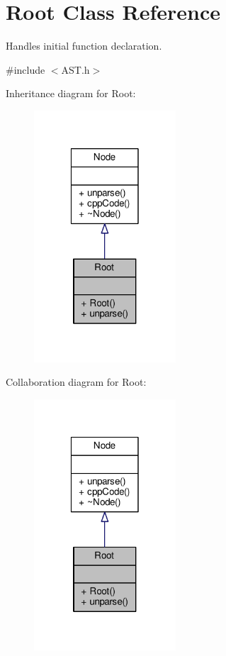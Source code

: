 \hypertarget{classRoot}{\section{Root Class Reference}
\label{classRoot}
}


Handles initial function declaration.  




{\ttfamily \#include $<$A\-S\-T.\-h$>$}



Inheritance diagram for Root\-:\nopagebreak
\begin{figure}[H]
\begin{center}
\leavevmode
\includegraphics[width=150pt]{classRoot__inherit__graph}
\end{center}
\end{figure}


Collaboration diagram for Root\-:\nopagebreak
\begin{figure}[H]
\begin{center}
\leavevmode
\includegraphics[width=150pt]{classRoot__coll__graph}
\end{center}
\end{figure}
